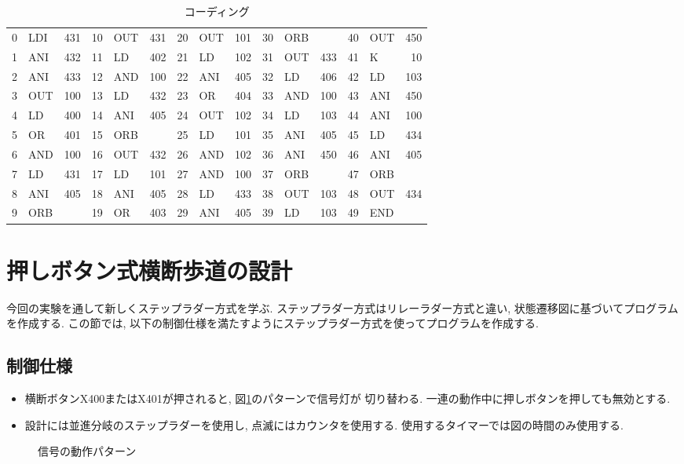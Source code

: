 \documentclass[titlepage]{jsarticle}
\begin{document}
    \begin{table}[h]
      \caption{コーディング}
      \label{tab:quiz_code}
      \centering
      \begin{tabular}{r|lr||r|lr||r|lr||r|lr||r|lr}
        0 & LDI & 431 & 10 & OUT & 431 & 20 & OUT & 101 & 30 & ORB & &     40 & OUT & 450 \\
        1 & ANI & 432 & 11 & LD &  402 & 21 & LD &  102 & 31 & OUT & 433 & 41 & K &   10 \\
        2 & ANI & 433 & 12 & AND & 100 & 22 & ANI & 405 & 32 & LD &  406 & 42 & LD &  103 \\
        3 & OUT & 100 & 13 & LD &  432 & 23 & OR &  404 & 33 & AND & 100 & 43 & ANI & 450 \\
        4 & LD &  400 & 14 & ANI & 405 & 24 & OUT & 102 & 34 & LD &  103 & 44 & ANI & 100 \\
        5 & OR &  401 & 15 & ORB & &     25 & LD &  101 & 35 & ANI & 405 & 45 & LD &  434 \\
        6 & AND & 100 & 16 & OUT & 432 & 26 & AND & 102 & 36 & ANI & 450 & 46 & ANI & 405 \\
        7 & LD &  431 & 17 & LD &  101 & 27 & AND & 100 & 37 & ORB & &     47 & ORB & \\
        8 & ANI & 405 & 18 & ANI & 405 & 28 & LD &  433 & 38 & OUT & 103 & 48 & OUT & 434 \\
        9 & ORB & &     19 & OR &  403 & 29 & ANI & 405 & 39 & LD &  103 & 49 & END & \\
      \end{tabular}
    \end{table}
\section{押しボタン式横断歩道の設計}
  今回の実験を通して新しくステップラダー方式を学ぶ.
  ステップラダー方式はリレーラダー方式と違い,
  状態遷移図に基づいてプログラムを作成する.
  この節では, 以下の制御仕様を満たすようにステップラダー方式を使ってプログラムを作成する.
  \subsection{制御仕様}
    \begin{itemize}
      \item 横断ボタンX400またはX401が押されると, 図\ref{fig:sig_pat}のパターンで信号灯が
        切り替わる. 一連の動作中に押しボタンを押しても無効とする.
      \item 設計には並進分岐のステップラダーを使用し, 点滅にはカウンタを使用する.
        使用するタイマーでは図の時間のみ使用する.
    \end{itemize}
    \begin{figure}[h]
      \centering
      \caption{信号の動作パターン}
      \label{fig:sig_pat}
    \end{figure}
\end{document}
